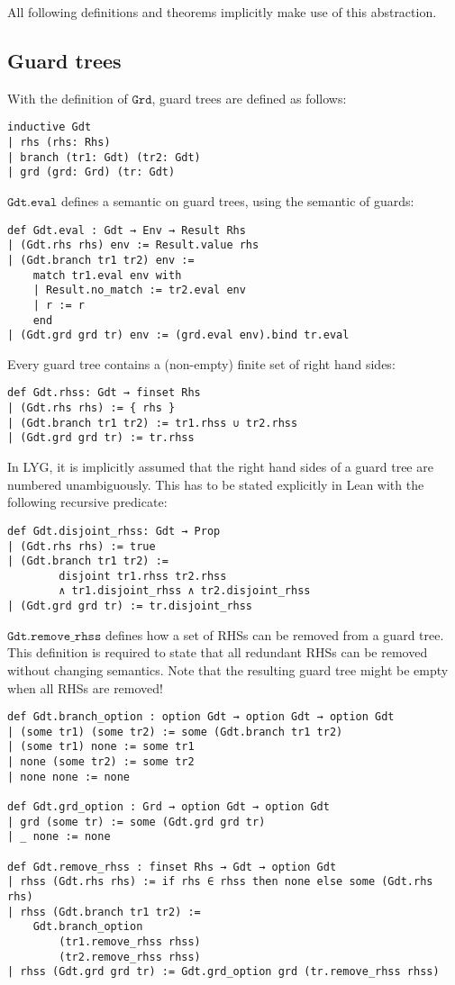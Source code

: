 All following definitions and theorems implicitly make use of this abstraction.

\subsection{Guard trees}

With the definition of $\mathtt{Grd}$, guard trees are defined as follows:

\begin{verbatim}
inductive Gdt
| rhs (rhs: Rhs)
| branch (tr1: Gdt) (tr2: Gdt)
| grd (grd: Grd) (tr: Gdt)
\end{verbatim}

$\mathtt{Gdt.eval}$ defines a semantic on guard trees, using the semantic of guards:

\begin{verbatim}
def Gdt.eval : Gdt → Env → Result Rhs
| (Gdt.rhs rhs) env := Result.value rhs
| (Gdt.branch tr1 tr2) env :=
    match tr1.eval env with
    | Result.no_match := tr2.eval env
    | r := r
    end
| (Gdt.grd grd tr) env := (grd.eval env).bind tr.eval
\end{verbatim}

Every guard tree contains a (non-empty) finite set of right hand sides:
\begin{verbatim}
def Gdt.rhss: Gdt → finset Rhs
| (Gdt.rhs rhs) := { rhs }
| (Gdt.branch tr1 tr2) := tr1.rhss ∪ tr2.rhss
| (Gdt.grd grd tr) := tr.rhss
\end{verbatim}

In LYG, it is implicitly assumed that the right hand sides of a guard tree are numbered unambiguously.
This has to be stated explicitly in Lean with the following recursive predicate:

\begin{verbatim}
def Gdt.disjoint_rhss: Gdt → Prop
| (Gdt.rhs rhs) := true
| (Gdt.branch tr1 tr2) :=
        disjoint tr1.rhss tr2.rhss
        ∧ tr1.disjoint_rhss ∧ tr2.disjoint_rhss
| (Gdt.grd grd tr) := tr.disjoint_rhss
\end{verbatim}

$\mathtt{Gdt.remove\_rhss}$ defines how a set of RHSs can be removed from a guard tree.
This definition is required to state that all redundant RHSs can be removed without changing semantics.
Note that the resulting guard tree might be empty when all RHSs are removed!

\begin{verbatim}
def Gdt.branch_option : option Gdt → option Gdt → option Gdt
| (some tr1) (some tr2) := some (Gdt.branch tr1 tr2)
| (some tr1) none := some tr1
| none (some tr2) := some tr2
| none none := none

def Gdt.grd_option : Grd → option Gdt → option Gdt
| grd (some tr) := some (Gdt.grd grd tr)
| _ none := none

def Gdt.remove_rhss : finset Rhs → Gdt → option Gdt
| rhss (Gdt.rhs rhs) := if rhs ∈ rhss then none else some (Gdt.rhs rhs)
| rhss (Gdt.branch tr1 tr2) :=
    Gdt.branch_option
        (tr1.remove_rhss rhss)
        (tr2.remove_rhss rhss)
| rhss (Gdt.grd grd tr) := Gdt.grd_option grd (tr.remove_rhss rhss)
\end{verbatim}

